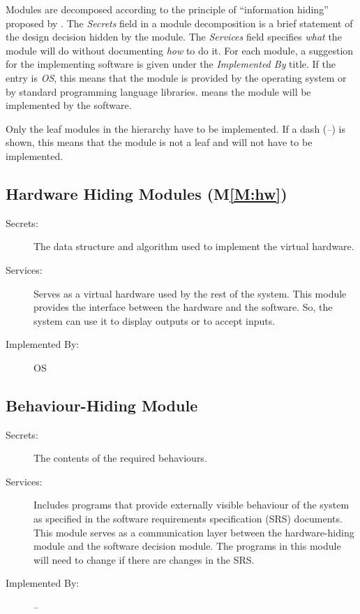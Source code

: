 \documentclass[12pt, titlepage]{article}
\newcommand{\mref}[1]{M\ref{#1}}
\begin{document}
Modules are decomposed according to the principle of ``information hiding''
proposed by \cite{ParnasEtAl1984}. The \emph{Secrets} field in a module
decomposition is a brief statement of the design decision hidden by the module.
The \emph{Services} field specifies \emph{what} the module will do without
documenting \emph{how} to do it. For each module, a suggestion for the
implementing software is given under the \emph{Implemented By} title. If the
entry is \emph{OS}, this means that the module is provided by the operating
system or by standard programming language libraries. \emph{\progname{}} means
the module will be implemented by the \progname{} software.

Only the leaf modules in the hierarchy have to be implemented. If a dash
(\emph{--}) is shown, this means that the module is not a leaf and will not have
to be implemented.

\subsection{Hardware Hiding Modules (\mref{M:hw})}

\begin{description}
\item[Secrets:] The data structure and algorithm used to implement the virtual
  hardware.
\item[Services:] Serves as a virtual hardware used by the rest of the system. This
  module provides the interface between the hardware and the software. So, the
  system can use it to display outputs or to accept inputs.
\item[Implemented By:] OS
\end{description}

\subsection{Behaviour-Hiding Module}

\begin{description}
\item[Secrets:] The contents of the required behaviours.
\item[Services:] Includes programs that provide externally visible behaviour of the
  system as specified in the software requirements specification (SRS)
  documents. This module serves as a communication layer between the
  hardware-hiding module and the software decision module. The programs in this
  module will need to change if there are changes in the SRS.
\item[Implemented By:] --
\end{description}
\end{document}
